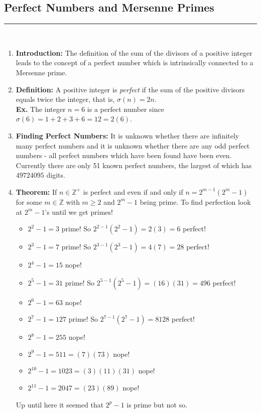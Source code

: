 \documentclass[class=article, crop=false]{standalone}
\def\integers{{\mathbb Z}}
\begin{document}
\subsection{Perfect Numbers and Mersenne Primes}
\rule{\textwidth}{1pt}\\
\begin{enumerate}
\item \textbf{Introduction:} The definition of the sum of the divisors of a positive integer
leads to the concept of a perfect number which is intrinsically connected to a Mersenne prime.

\item \textbf{Definition:} A positive integer is \emph{perfect} if the sum of the positive
divisors equals twice the integer, that is, $\sigma(n) = 2n$.\\
\textbf{Ex.} The integer $n=6$ is a perfect number since $\sigma(6) = 1+2+3+6=12=2(6)$.

\item \textbf{Finding Perfect Numbers:} It is unknown whether there are infinitely many
perfect numbers and it is unknown whether there are any odd perfect numbers - all perfect numbers
which have been found have been even. Currently there are only 51 known perfect numbers,
the largest of which has $49724095$ digits. 

\item \textbf{Theorem:} If $n\in\integers^+$ is perfect and even if and only if
$n=2^{m-1}(2^m - 1)$ for some $m\in\integers$ with $m\geq 2$ and $2^m-1$ being prime.
To find perfection look at $2^m - 1$'s until we get primes!
\begin{itemize}
	\item $2^{2}-1=3$ prime! So $2^{2-1} (2^2 -1)=2(3)=6$ perfect!
	\item $2^3 -1 =7$ prime! So $2^{3-1} (2^3 -1)=4(7)=28$ perfect!
	\item $2^4 -1 =15$ nope!
	\item $2^5 -1 =31$ prime! So $2^{5-1} (2^5 -1)=(16)(31)=496$ perfect!
	\item $2^6-1 =63$ nope!
	\item $2^7 -1=127$ prime! So $2^{7-1} (2^7 -1)=8128$ perfect!
	\item $2^8 -1=255$ nope!
	\item $2^9 -1=511=(7)(73)$ nope!
	\item $2^{10}-1=1023=(3)(11)(31)$ nope!
	\item $2^{11}-1=2047=(23)(89)$ nope!
\end{itemize}
Up until here it seemed that $2^p -1$ is prime but not so.


\end{enumerate}
\end{document}
